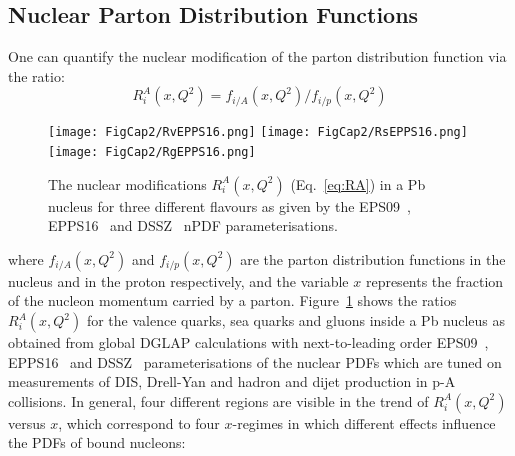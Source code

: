 \subsection{Nuclear Parton Distribution Functions}
\label{sec:nPDFs}
One can quantify the nuclear modification of the parton distribution function via the ratio:
\begin{equation}
\label{eq:RA}
R_i^A(x,Q^2) = f_{i/A}(x,Q^2) / f_{i/p}(x,Q^2)
\end{equation}
\begin{figure}[!ht]
  \centering
  \texttt{[image: FigCap2/RvEPPS16.png]}
  \texttt{[image: FigCap2/RsEPPS16.png]}
  \texttt{[image: FigCap2/RgEPPS16.png]}
  \caption{The nuclear modifications $R_i^A(x,Q^2)$ (Eq.~\ref{eq:RA}) in a Pb nucleus for three different flavours as given by the EPS09~\cite{Eskola:2009uj}, EPPS16~\cite{Eskola:2016oht} and DSSZ~\cite{deFlorian:2011fp} nPDF parameterisations.}
  \label{fig:nPDF}
\end{figure}
where $f_{i/A}(x,Q^2)$ and $f_{i/p}(x,Q^2)$ are the parton distribution functions in the 
nucleus and in the proton respectively, and the variable $x$ represents the fraction of 
the nucleon momentum carried by a parton. Figure~\ref{fig:nPDF} 
shows the ratios $R_i^A(x,Q^2)$ for the valence quarks, sea quarks and 
gluons inside a Pb nucleus as obtained from global DGLAP 
calculations with next-to-leading order EPS09~\cite{Eskola:2009uj}, 
EPPS16~\cite{Eskola:2016oht} and DSSZ~\cite{deFlorian:2011fp}
parameterisations of the nuclear PDFs which are tuned on measurements
of DIS, Drell-Yan and hadron and dijet production in p-A collisions. 
In general, four different regions are visible in the trend of $R_i^A(x,Q^2)$ versus $x$,
which correspond to four $x$-regimes in which different 
effects influence the PDFs of bound nucleons:
